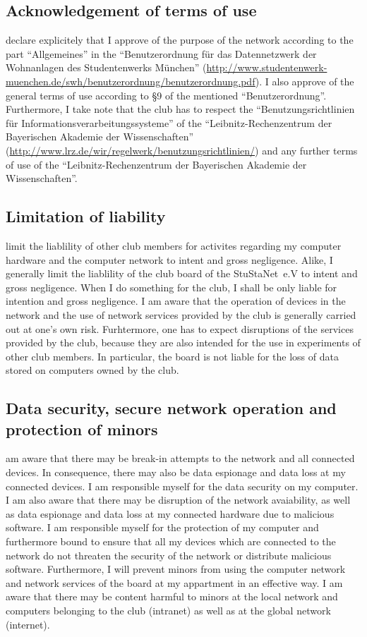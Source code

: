 \documentclass[a4paper,10pt]{scrartcl}
\begin{document}
\subsection*{Acknowledgement of terms of use}
 declare explicitely that I approve of the purpose of the network according to the part \enquote{Allgemeines} in the \enquote{Benutzerordnung für das Datennetzwerk der Wohnanlagen des Studentenwerks München} (\url{http://www.studentenwerk-muenchen.de/swh/benutzerordnung/benutzerordnung.pdf}). I also approve of the general terms of use according to §9 of the mentioned \enquote{Benutzerordnung}. Furthermore, I take note that the club has to respect the \enquote{Benutzungsrichtlinien für Informationsverarbeitungssysteme} of the \enquote{Leibnitz-Rechenzentrum der Bayerischen Akademie der Wissenschaften} (\url{http://www.lrz.de/wir/regelwerk/benutzungsrichtlinien/}) and any further terms of use of the \enquote{Leibnitz-Rechenzentrum der Bayerischen Akademie der Wissenschaften}.

\subsection*{Limitation of liability}
 limit the liablility of other
club members for activites regarding my computer hardware and the computer network to intent and gross negligence. Alike, I generally limit the liablility of the club board of the StuStaNet~e.V to intent and gross negligence. When I do something for the club, I shall be only liable for intention and gross negligence. I am aware that the operation of devices in the network and the use of network services provided by the club is generally carried out at one's own risk. Furhtermore, one has to expect disruptions of the services provided by the club, because they are also intended for the use in experiments of other club members. In particular, the board is not liable for the loss of data stored on computers owned by the club.

\subsection*{Data security, secure network operation and protection of minors}
 am aware that there may be break-in attempts to the network and all connected devices. In consequence, there may also be data espionage and data loss at my connected devices. I am responsible myself for the data security on my computer. I am also aware that there may be disruption of the network avaiability, as well as data espionage and data loss at my connected hardware due to malicious software. I am responsible myself for the protection of my computer and furthermore bound to ensure that all my devices which are connected to the network do not threaten the security of the network or distribute malicious software. Furthermore, I will prevent minors from using the computer network and network services of the board at my appartment in an effective way. I am aware that there may be content harmful to minors at the local network and computers belonging to the club (intranet) as well as at the global network (internet). 
 
\end{document}

